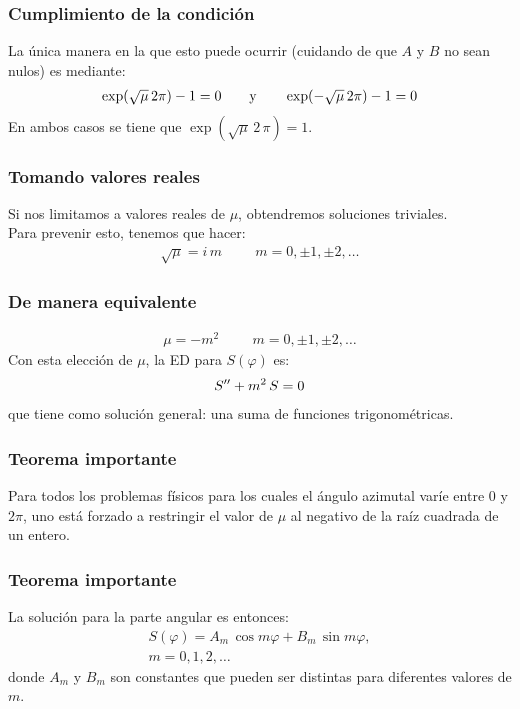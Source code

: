 \documentclass[12pt]{beamer}
\begin{document}
\begin{frame}
\frametitle{Cumplimiento de la condición}
La única manera en la que esto puede ocurrir (cuidando de que $A$ y $B$ no sean nulos) es mediante:
\pause
\begin{align*}
\exp(\sqrt{\mu} \, 2 \pi) - 1 = 0 \hspace{0.7cm} \mbox{y} \hspace{0.7cm} \exp(- \sqrt{\mu} \, 2 \pi) - 1 = 0
\end{align*}
\pause
En ambos casos se tiene que $\exp(\sqrt{\mu} \, 2 \, \pi) = 1$.
\end{frame}
\begin{frame}
\frametitle{Tomando valores reales}
Si nos limitamos a valores reales de $\mu$, obtendremos soluciones triviales.
\\
\bigskip
\pause
Para prevenir esto, tenemos que hacer:
\pause
\begin{align*}
\sqrt{\mu} = i \, m \hspace{1cm} m = 0, \pm 1, \pm 2, \ldots
\end{align*}
\end{frame}
\begin{frame}
\frametitle{De manera equivalente}
\begin{align*}
\mu = -m^{2}  \hspace{1cm} m = 0, \pm 1, \pm 2, \ldots
\end{align*}
\pause
Con esta elección de $\mu$, la ED para $S(\varphi)$ es:
\pause
\begin{align*}
{S}^{\prime \prime} + m^{2} \, S = 0
\end{align*}
\pause
que tiene como solución general: una suma de funciones trigonométricas.
\end{frame}
\begin{frame}
\frametitle{Teorema importante}
Para todos los problemas físicos para los cuales el ángulo azimutal varíe entre $0$ y $2 \pi$, uno está forzado a restringir el valor de $\mu$ al negativo de la raíz cuadrada de un entero.
\end{frame}
\begin{frame}
\frametitle{Teorema importante}
La solución para la parte angular es entonces:
\pause
\begin{equation}
\begin{aligned}
S (\varphi) = A_{m} \, \cos m \varphi + B_{m} \, \sin m \varphi, \\[0.5em]
m = 0, 1, 2, \ldots
\end{aligned}
\label{eq:ecuacion_27_03}
\end{equation}
donde $A_{m}$ y $B_{m}$ son constantes que pueden ser distintas para diferentes valores de $m$.
\end{frame}
\end{document}
